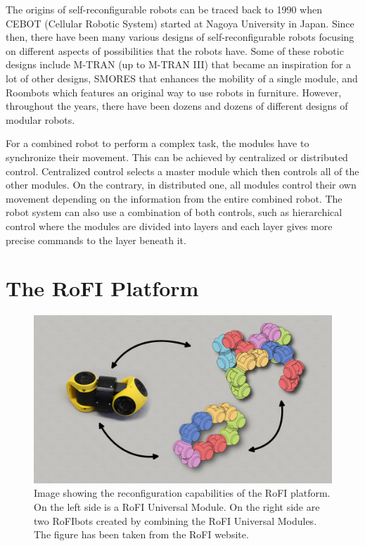 \documentclass[
  printed, %
  color,   %
  notable, %
  oneside, %
  nolof,   %
  nolot,   %
  nocover,
]{fithesis3}
\begin{document}
The origins of self-reconfigurable robots can be traced back to 1990 when CEBOT (Cellular Robotic System) started at Nagoya University in Japan.\cite{current-trends}
Since then, there have been many various designs of self-reconfigurable robots focusing on different aspects of possibilities that the robots have.
Some of these robotic designs include M-TRAN (up to M-TRAN III)\cite{mtran} that became an inspiration for a lot of other designs, SMORES\cite{smores} that enhances the mobility of a single module, and Roombots\cite{roombots} which features an original way to use robots in furniture.
However, throughout the years, there have been dozens and dozens of different designs of modular robots.\cite{current-trends}

For a combined robot to perform a complex task, the modules have to synchronize their movement.
This can be achieved by centralized or distributed control.
Centralized control selects a master module which then controls all of the other modules.
On the contrary, in distributed one, all modules control their own movement depending on the information from the entire combined robot.
The robot system can also use a combination of both controls, such as hierarchical control where the modules are divided into layers and each layer gives more precise commands to the layer beneath it.


\chapter{The RoFI Platform}

\begin{figure}
    \centering
    \includegraphics[width=\linewidth]{data/rofi_transformation.jpg}
    \caption{Image showing the reconfiguration capabilities of the RoFI platform. On the left side is a RoFI Universal Module. On the right side are two RoFIbots created by combining the RoFI Universal Modules. The figure has been taken from the RoFI website\cite{rofi-web}.}
    \label{fig:rofi-transform}
\end{figure}
\end{document}
